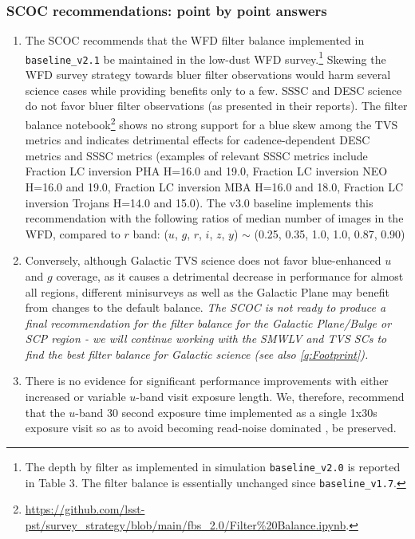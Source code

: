 \subsubsection{SCOC recommendations: point by point answers }\label{rec:filterdist}

\begin{enumerate}

\item The SCOC recommends that the WFD filter balance implemented in \texttt{baseline\_v2.1}  be maintained in the low-dust WFD survey.\footnote{The depth by filter as implemented in simulation \texttt{baseline\_v2.0} is reported in \citep{PSTN-054} Table 3. The filter balance is essentially unchanged since \texttt{baseline\_v1.7}.} Skewing the WFD survey strategy towards bluer filter observations would harm several science cases while providing benefits only to a few. 
SSSC and DESC science do not favor bluer filter observations (as presented in their reports).
The filter balance notebook\footnote{
\url{https://github.com/lsst-pst/survey_strategy/blob/main/fbs_2.0/Filter\%20Balance.ipynb}.
} shows no strong support for a blue skew among the TVS metrics and indicates detrimental effects for cadence-dependent DESC metrics and SSSC metrics (examples of relevant SSSC metrics include Fraction LC inversion PHA H=16.0 and 19.0, Fraction LC inversion NEO H=16.0 and 19.0, Fraction LC inversion MBA H=16.0 and 18.0, Fraction LC inversion Trojans H=14.0 and 15.0). The v3.0 baseline implements this recommendation with the following ratios of median number of images in the WFD, compared to $r$ band: ($u$, $g$, $r$, $i$, $z$, $y$) $\sim$ (0.25, 0.35, 1.0, 1.0, 0.87, 0.90)


\item Conversely, although Galactic TVS science does not favor blue-enhanced $u$ and $g$ coverage, as it causes a detrimental decrease in performance for almost all regions,  different minisurveys as well as the Galactic Plane may benefit from changes to the default balance. \emph{The SCOC is not ready to produce a final recommendation for the filter balance for the Galactic Plane/Bulge or SCP region - we will continue working with the SMWLV and TVS SCs to find the best filter balance for Galactic science (see also \autoref{q:Footprint}).}

\item There is no evidence for significant performance improvements with either increased or variable $u$-band visit exposure length. We, therefore, recommend that the $u$-band 30 second exposure time implemented as a single 1x30s exposure visit so as to avoid becoming read-noise dominated \citep{PSTN-053},  be preserved.


\end{enumerate}
